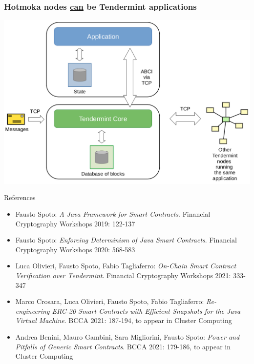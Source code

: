 \documentclass[11pt]{beamer}  %
\begin{document}
\begin{frame}\frametitle{Hotmoka nodes \underline{can} be Tendermint applications}

  \begin{center}
    \includegraphics[width=\textwidth,clip=false]{pictures/tendermint-databases.png}
  \end{center}
    
\end{frame}

\begin{frame}{References}
  \begin{itemize}
  \item Fausto Spoto:
\emph{A Java Framework for Smart Contracts}. Financial Cryptography Workshops 2019: 122-137
  \item Fausto Spoto:
\emph{Enforcing Determinism of Java Smart Contracts}. Financial Cryptography Workshops 2020: 568-583
  \item Luca Olivieri, Fausto Spoto, Fabio Tagliaferro:
\emph{On-Chain Smart Contract Verification over Tendermint}. Financial Cryptography Workshops 2021: 333-347
  \item Marco Crosara, Luca Olivieri, Fausto Spoto, Fabio Tagliaferro:
\emph{Re-engineering ERC-20 Smart Contracts with Efficient Snapshots for the Java Virtual Machine}. BCCA 2021: 187-194, to appear in Cluster Computing
  \item Andrea Benini, Mauro Gambini, Sara Migliorini, Fausto Spoto:
\emph{Power and Pitfalls of Generic Smart Contracts}. BCCA 2021: 179-186, to appear in Cluster Computing
  \end{itemize}
\end{frame}
\end{document}
